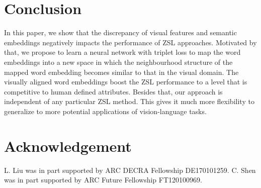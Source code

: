 \documentclass{bmvc2k}
\begin{document}
\section{Conclusion}
In this paper, we show that the discrepancy of visual features and semantic embeddings negatively impacts the performance of ZSL approaches. Motivated by that, we propose to learn a neural network with triplet loss to map the word embeddings into a new space in which the neighbourhood structure of the mapped word embedding becomes similar to that in the visual domain. The visually aligned word embeddings boost the ZSL performance to a level that is competitive to human defined attributes. Besides that, our approach is independent of any particular ZSL method. This gives it much more flexibility to generalize to more potential applications of vision-language tasks.





\section*{Acknowledgement}
L. Liu was in part supported by ARC DECRA Fellowship DE170101259.
C. Shen was in part supported by ARC Future Fellowship FT120100969.










\end{document}
